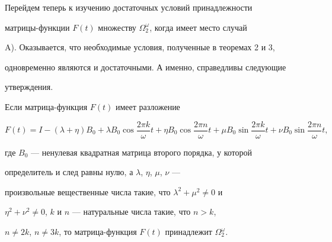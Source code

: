  


Перейдем теперь к изучению достаточных условий принадлежности 


матрицы-функции $F(t)$ множеству $\Omega^\omega_2$, когда имеет место случай 


A). Оказывается, что необходимые условия, полученные в теоремах 2 и 3, 


одновременно являются и достаточными. А именно, справедливы следующие 


утверждения. 


 


 


\begin{thm} 


Если матрица-функция $F(t)$ имеет разложение 


$$ 


F(t)=I-(\lambda+\eta)B_0+\lambda B_0 


\cos\frac{2\pi k}{\omega}t+\eta B_0 


\cos\frac{2\pi n}{\omega}t+\mu B_0 


\sin\frac{2\pi k}{\omega}t+\nu B_0 


\sin\frac{2\pi n}{\omega}t, 


$$ 


где $B_0$ --- ненулевая квадратная матрица второго порядка, у которой 


определитель и след равны нулю, а $\lambda$, $\eta$, $\mu$, $\nu$ --- 


произвольные вещественные числа такие, что $\lambda^2+\mu^2{\ne}0$ и 


$\eta^2+\nu^2{\ne}0$, $k$ и $n$ --- натуральные числа такие, что $n>k$, 


$n\ne2k$, $n\ne3k$, то матрица-функция $F(t)$ принадлежит $\Omega^\omega_2$. 


\end{thm} 


 






